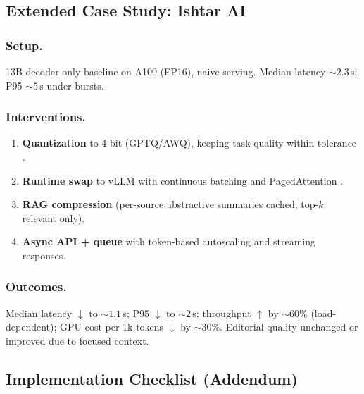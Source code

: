 \subsection{Extended Case Study: Ishtar AI}
\label{sec:perf-ishtar-extended}
\subsubsection{Setup.} 13B decoder-only baseline on A100 (FP16), naive serving. Median latency $\sim2.3$\,s; P95 $\sim5$\,s under bursts.

\subsubsection{Interventions.}
\begin{enumerate}
  \item \textbf{Quantization} to 4-bit (GPTQ/AWQ), keeping task quality within tolerance \cite{Frantar2023GPTQ,Lin2023AWQ}.
  \item \textbf{Runtime swap} to vLLM with continuous batching and PagedAttention \cite{Kwon2023vLLM}.
  \item \textbf{RAG compression} (per-source abstractive summaries cached; top-$k$ relevant only).
  \item \textbf{Async API + queue} with token-based autoscaling and streaming responses.
\end{enumerate}

\subsubsection{Outcomes.}
Median latency $\downarrow$ to $\sim1.1$\,s; P95 $\downarrow$ to $\sim2$\,s; throughput $\uparrow$ by $\sim60\%$ (load-dependent); GPU cost per 1k tokens $\downarrow$ by $\sim30\%$. Editorial quality unchanged or improved due to focused context.

\subsection{Implementation Checklist (Addendum)}
\label{sec:perf-impl-checklist}

